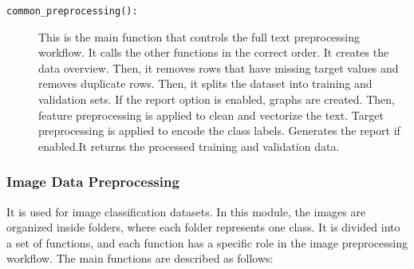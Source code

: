 \documentclass[12pt,a4paper]{report}
\begin{document}
\begin{description}
\item[\texttt{common\_preprocessing():}]
This is the main function that controls the full text preprocessing workflow. It calls
the other functions in the correct order.
It creates the data overview. Then, it removes rows that have missing target
values and removes duplicate rows. Then, it splits the dataset into training and
validation sets. If the report option is enabled, graphs are created. Then, feature preprocessing is applied to clean and
vectorize the text. Target preprocessing is applied to encode the class
labels. Generates the report if enabled.It returns the processed
training and validation data.
\end{description}

\subsubsection{Image Data Preprocessing}

\noindent It is used for image classification datasets. In this
module, the images are organized inside folders, where each folder represents one class.
It is divided into a set of functions, and each function has a specific role in
the image preprocessing workflow. The main functions are described as follows:
\end{document}
